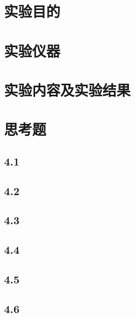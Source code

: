 \documentclass[UTF8]{article}
\begin{document}
\section{实验目的}



\section{实验仪器}

\section{实验内容及实验结果}

\section{思考题}

\subsection*{4.1 \ \ }
\subsection*{4.2 \ \ }
\subsection*{4.3 \ \ }
\subsection*{4.4 \ \ }
\subsection*{4.5 \ \ }
\subsection*{4.6 \ \ }
\end{document}
